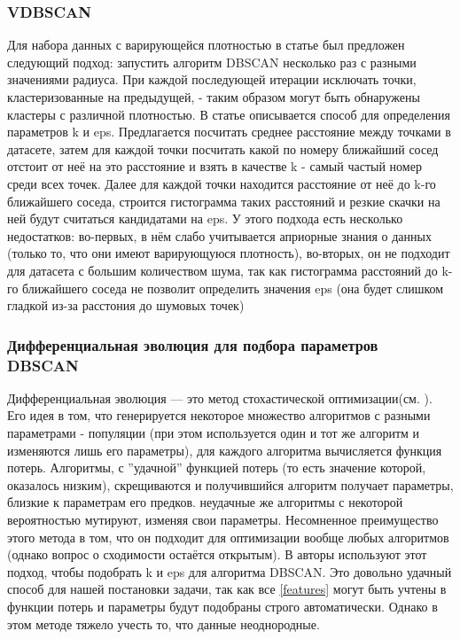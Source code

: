 \documentclass[12pt,fleqn]{article}
\begin{document}
\subsubsection{VDBSCAN}
Для набора данных с варирующейся плотностью в статье \cite{VDBSCAN} был предложен следующий подход: запустить алгоритм DBSCAN несколько раз с разными значениями радиуса. При каждой последующей итерации исключать точки, кластеризованные на предыдущей, - таким образом могут быть обнаружены кластеры с различной плотностью. В статье \cite{AutoVDBSCAN} описывается способ для определения параметров k и eps. Предлагается посчитать среднее расстояние между точками в датасете, затем для каждой точки посчитать какой по номеру ближайший сосед отстоит от неё на это расстояние и взять в качестве
k - самый частый номер среди всех точек. Далее для каждой точки находится расстояние от неё до k-го ближайшего соседа, строится гистограмма таких расстояний и резкие скачки на ней будут считаться кандидатами на eps. 
У этого подхода есть несколько недостатков: во-первых, в нём слабо учитывается априорные знания о данных (только то, что они имеют варирующуюся плотность), во-вторых, он не подходит для датасета с большим количеством шума, так как гистограмма расстояний до k-го ближайшего соседа не позволит определить значения eps (она будет слишком гладкой из-за расстония до шумовых точек)

\subsubsection{Дифференциальная эволюция для подбора параметров DBSCAN}
Дифференциальная эволюция --- это метод стохастической оптимизации(см. \cite{dif_evol}). Его идея в том, что генерируется некоторое множество алгоритмов с разными параметрами - популяции (при этом используется один и тот же алгоритм и изменяются лишь его параметры), для каждого алгоритма вычисляется функция потерь. Алгоритмы, с ''удачной'' функцией потерь (то есть значение которой, оказалось низким), скрещиваются и получившийся алгоритм получает параметры, близкие к параметрам его предков. неудачные же алгоритмы с некоторой вероятностью мутируют, изменяя свои параметры. Несомненное преимущество этого метода в том, что он подходит для оптимизации вообще любых алгоритмов (однако вопрос о сходимости остаётся открытым). В \cite{BDE-DBSCAN} авторы используют этот подход, чтобы подобрать k и eps для алгоритма DBSCAN. Это довольно удачный способ для нашей постановки задачи, так как все \ref{features} могут быть учтены в функции потерь и параметры будут подобраны строго автоматически. Однако в этом методе тяжело учесть то, что данные неоднородные.
\end{document}
